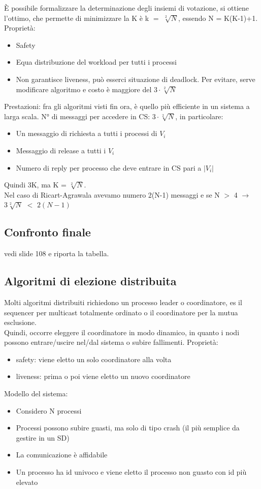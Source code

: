 \documentclass[16px]{article}
\begin{document}
È possibile formalizzare la determinazione degli insiemi di votazione, si ottiene l'ottimo, che permette di minimizzare la K è k $=$ $\sqrt[2]{N}$, essendo N = K(K-1)+1.\\ Proprietà:
\begin{itemize}
\item Safety
\item Equa distribuzione del workload per tutti i processi
\item Non garantisce liveness, può esserci situazione di deadlock. Per evitare, serve modificare algoritmo e costo è maggiore del $3\cdot \sqrt[2]{N}$
\end{itemize}
Prestazioni: fra gli algoritmi visti fin ora, è quello più efficiente in un sistema a larga scala. N° di messaggi per accedere in CS: $3\cdot \sqrt[2]{N}$, in particolare:
\begin{itemize}
\item Un messaggio di richiesta a tutti i processi di $V_i$
\item Messaggio di release a tutti i $V_i$
\item Numero di reply per processo che deve entrare in CS pari a $|V_i|$
\end{itemize}
Quindi 3K, ma K = $\sqrt[2]{N}$.\\ Nel caso di Ricart-Agrawala avevamo numero 2(N-1) messaggi e se N $>$ 4 $\rightarrow$ $3\sqrt[2]{N}$ $<$ $2(N-1)$
\subsection{Confronto finale}
vedi slide 108 e riporta la tabella.
\subsection{Algoritmi di elezione distribuita}
Molti algoritmi distribuiti richiedono un processo leader o coordinatore, es il sequencer per multicast totalmente ordinato o il coordinatore per la mutua esclusione.\\ Quindi, occorre eleggere il coordinatore in modo dinamico, in quanto i nodi possono entrare/uscire nel/dal sistema o subire fallimenti. Proprietà:
\begin{itemize}
\item safety: viene eletto un solo coordinatore alla volta
\item liveness: prima o poi viene eletto un nuovo coordinatore
\end{itemize}
Modello del sistema:
\begin{itemize}
\item Considero N processi
\item Processi possono subire guasti, ma solo di tipo crash (il più semplice da gestire in un SD)
\item La comunicazione è affidabile
\item Un processo ha id univoco e viene eletto il processo non guasto con id più elevato
\end{itemize}
\end{document}
